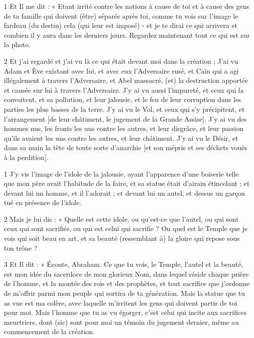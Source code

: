 
\par 1 Et Il me dit : « Etant irrité contre les nations à cause de toi et à cause des gens de ta famille qui doivent (être) séparés après toi, comme tu vois sur l'image le fardeau (du destin) cela (qui leur est imposé) - et je te dirai ce qui arrivera et combien il y aura dans les derniers jours. Regardez maintenant tout ce qui est sur la photo.

\par 2 Et j'ai regardé et j'ai vu là ce qui était devant moi dans la création ; J'ai vu Adam et Ève existant avec lui, et avec eux l'Adversaire rusé, et Caïn qui a agi illégalement à travers l'Adversaire, et Abel massacré, (et) la destruction apportée et causée sur lui à travers l'Adversaire. J'y ai vu aussi l'impureté, et ceux qui la convoitent, et sa pollution, et leur jalousie, et le feu de leur corruption dans les parties les plus basses de la terre. J'y ai vu le Vol, et ceux qui s'y précipitent, et l'arrangement [de leur châtiment, le jugement de la Grande Assise]. J'y ai vu des hommes nus, les fronts les uns contre les autres, et leur disgrâce, et leur passion qu'ils avaient les uns contre les autres, et leur châtiment. J'y ai vu le Désir, et dans sa main la tête de toute sorte d'anarchie [et son mépris et ses déchets voués à la perdition].


\par 1 J'y vis l'image de l'idole de la jalousie, ayant l'apparence d'une boiserie telle que mon père avait l'habitude de la faire, et sa statue était d'airain étincelant ; et devant lui un homme, et il l'adorait ; et devant lui un autel, et dessus un garçon tué en présence de l'idole.

\par 2 Mais je lui dis : « Quelle est cette idole, ou qu'est-ce que l'autel, ou qui sont ceux qui sont sacrifiés, ou qui est celui qui sacrifie ? Ou quel est le Temple que je vois qui soit beau en art, et sa beauté (ressemblant à) la gloire qui repose sous ton trône ?

\par 3 Et Il dit : « Écoute, Abraham. Ce que tu vois, le Temple, l'autel et la beauté, est mon idée du sacerdoce de mon glorieux Nom, dans lequel réside chaque prière de l'homme, et la montée des rois et des prophètes, et tout sacrifice que j'ordonne de m'offrir parmi mon peuple qui sortira de ta génération. Mais la statue que tu as vue est ma colère, avec laquelle m'irritent les gens qui doivent partir de toi pour moi. Mais l'homme que tu as vu égorger, c'est celui qui incite aux sacrifices meurtriers, dont (sic) sont pour moi un témoin du jugement dernier, même au commencement de la création.

